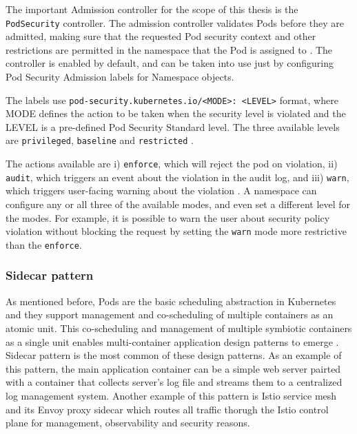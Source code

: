\documentclass[english, 12pt, a4paper, sci, utf8, a-2b, online]{aaltothesis}
\begin{document}
The important Admission controller for the scope of this thesis is the \texttt{PodSecurity} controller. The admission controller validates Pods before they are admitted, making sure that the requested Pod security context and other restrictions are permitted in the namespace that the Pod is assigned to \cite{k8s-docs-admission}. The controller is enabled by default, and can be taken into use just by configuring Pod Security Admission labels for Namespace objects.

The labels use \texttt{pod-security.kubernetes.io/<MODE>: <LEVEL>} format, where MODE defines the action to be taken when the security level is violated and the LEVEL is a pre-defined Pod Security Standard level. The three available levels are \texttt{privileged}, \texttt{baseline} and \texttt{restricted} \cite{k8s-docs-pss}.

The actions available are i) \texttt{enforce}, which will reject the pod on violation, ii) \texttt{audit}, which triggers an event about the violation in the audit log, and iii) \texttt{warn}, which triggers user-facing warning about the violation \cite{k8s-docs-psa}. A namespace can configure any or all three of the available modes, and even set a different level for the modes. For example, it is possible to warn the user about security policy violation without blocking the request by setting the \texttt{warn} mode more restrictive than the \texttt{enforce}.

\subsubsection{Sidecar pattern}

As mentioned before, Pods are the basic scheduling abstraction in Kubernetes and they support management and co-scheduling of multiple containers as an atomic unit. This co-scheduling and management of multiple symbiotic containers as a single unit enables multi-container application design patterns to emerge \cite{burns2016design}. Sidecar pattern is the most common of these design patterns. As an example of this pattern, the main application container can be a simple web server pairted with a container that collects server's log file and streams them to a centralized log management system. Another example of this pattern is Istio service mesh \cite{istio} and its Envoy proxy sidecar which routes all traffic thorugh the Istio control plane for management, observability and security reasons.
\end{document}
